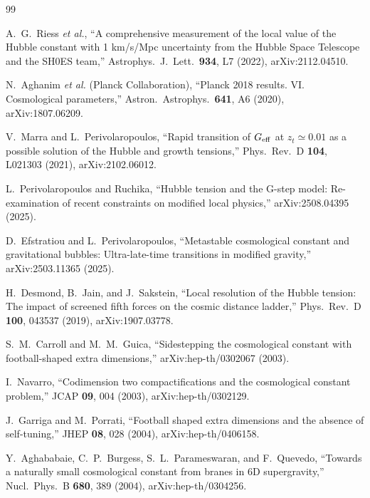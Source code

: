 \documentclass[aps,prd,reprint,superscriptaddress,nofootinbib,floatfix]{revtex4-2}
\theoremstyle{definition}
\begin{document}
\begin{thebibliography}{99}

 A.~G.~Riess \emph{et al.}, ``A comprehensive measurement of the local value of the Hubble constant with 1 km/s/Mpc uncertainty from the Hubble Space Telescope and the SH0ES team,'' Astrophys.\ J.\ Lett.\ \textbf{934}, L7 (2022), arXiv:2112.04510.

 N.~Aghanim \emph{et al.} (Planck Collaboration), ``Planck 2018 results. VI. Cosmological parameters,'' Astron.\ Astrophys.\ \textbf{641}, A6 (2020), arXiv:1807.06209.

 V.~Marra and L.~Perivolaropoulos, ``Rapid transition of $G_{\rm eff}$ at $z_t\simeq0.01$ as a possible solution of the Hubble and growth tensions,'' Phys.\ Rev.\ D \textbf{104}, L021303 (2021), arXiv:2102.06012.

 L.~Perivolaropoulos and Ruchika, ``Hubble tension and the G-step model: Re-examination of recent constraints on modified local physics,'' arXiv:2508.04395 (2025).

 D.~Efstratiou and L.~Perivolaropoulos, ``Metastable cosmological constant and gravitational bubbles: Ultra-late-time transitions in modified gravity,'' arXiv:2503.11365 (2025).

 H.~Desmond, B.~Jain, and J.~Sakstein, ``Local resolution of the Hubble tension: The impact of screened fifth forces on the cosmic distance ladder,'' Phys.\ Rev.\ D \textbf{100}, 043537 (2019), arXiv:1907.03778.

 S.~M.~Carroll and M.~M.~Guica, ``Sidestepping the cosmological constant with football-shaped extra dimensions,'' arXiv:hep-th/0302067 (2003).

 I.~Navarro, ``Codimension two compactifications and the cosmological constant problem,'' JCAP \textbf{09}, 004 (2003), arXiv:hep-th/0302129.

 J.~Garriga and M.~Porrati, ``Football shaped extra dimensions and the absence of self-tuning,'' JHEP \textbf{08}, 028 (2004), arXiv:hep-th/0406158.

 Y.~Aghababaie, C.~P.~Burgess, S.~L.~Parameswaran, and F.~Quevedo, ``Towards a naturally small cosmological constant from branes in 6D supergravity,'' Nucl.\ Phys.\ B \textbf{680}, 389 (2004), arXiv:hep-th/0304256.


\end{thebibliography}
\end{document}
